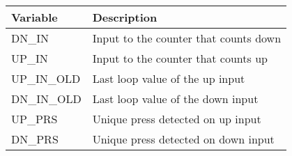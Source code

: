 \documentclass[11pt]{article}
\begin{document}
\begin{longtable}[]{@{}ll@{}}
\toprule
\begin{minipage}[b]{0.05\columnwidth}\raggedright\strut
Variable\strut
\end{minipage} & \begin{minipage}[b]{0.05\columnwidth}\raggedright\strut
Description\strut
\end{minipage}\tabularnewline
\midrule
\endhead
\begin{minipage}[t]{0.05\columnwidth}\raggedright\strut
DN\_IN\strut
\end{minipage} & \begin{minipage}[t]{0.05\columnwidth}\raggedright\strut
Input to the counter that counts down\strut
\end{minipage}\tabularnewline
\begin{minipage}[t]{0.05\columnwidth}\raggedright\strut
UP\_IN\strut
\end{minipage} & \begin{minipage}[t]{0.05\columnwidth}\raggedright\strut
Input to the counter that counts up\strut
\end{minipage}\tabularnewline
\begin{minipage}[t]{0.05\columnwidth}\raggedright\strut
UP\_IN\_OLD\strut
\end{minipage} & \begin{minipage}[t]{0.05\columnwidth}\raggedright\strut
Last loop value of the up input\strut
\end{minipage}\tabularnewline
\begin{minipage}[t]{0.05\columnwidth}\raggedright\strut
DN\_IN\_OLD\strut
\end{minipage} & \begin{minipage}[t]{0.05\columnwidth}\raggedright\strut
Last loop value of the down input\strut
\end{minipage}\tabularnewline
\begin{minipage}[t]{0.05\columnwidth}\raggedright\strut
UP\_PRS\strut
\end{minipage} & \begin{minipage}[t]{0.05\columnwidth}\raggedright\strut
Unique press detected on up input\strut
\end{minipage}\tabularnewline
\begin{minipage}[t]{0.05\columnwidth}\raggedright\strut
DN\_PRS\strut
\end{minipage} & \begin{minipage}[t]{0.05\columnwidth}\raggedright\strut
Unique press detected on down input\strut

\end{minipage}
\end{longtable}
\end{document}
